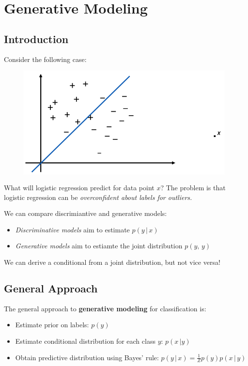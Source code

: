 \documentclass[a4paper]{extarticle}
\begin{document}
\section{Generative Modeling}

\subsection{Introduction}

Consider the following case:

\begin{figure}[H]
    \includegraphics[width=11cm]{../images/IntroML_Fig11-1}
    \centering
\end{figure}

What will logistic regression predict for data point $x$? The problem is that logistic regression can be \textit{overconfident about labels for outliers.}

We can compare discrimiantive and generative models:
\begin{itemize}
    \item \textit{Discriminative models} aim to estimate $p(y \, | \, x)$
    \item \textit{Generative models} aim to estiamte the joint distribution $p(y, \, y)$
\end{itemize}

We can derive a conditional from a joint distribution, but not vice versa!

\subsection{General Approach}

The general approach to \textbf{generative modeling} for classification is:

\begin{itemize}
    \item Estimate prior on labels: $p(y)$
    \item Estimate conditional distribution for each class $y$: $p(x \, | y)$
    \item Obtain predictive distribution using Bayes' rule: $p(y \, | \, x) = \frac{1}{Z}p(y)p(x \, | \, y)$
\end{itemize}
\end{document}
